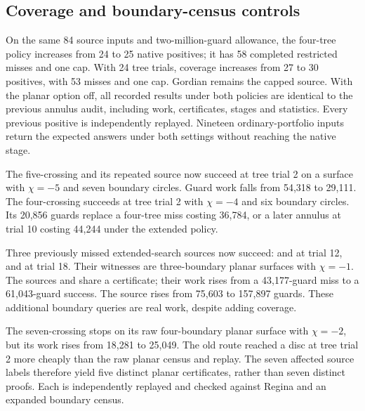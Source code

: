 \subsection{Coverage and boundary-census controls}

On the same 84 source inputs and two-million-guard allowance, the four-tree
policy increases from 24 to 25 native positives; it has 58 completed
restricted misses and one cap. With 24 tree trials, coverage increases
from 27 to 30 positives, with 53 misses and one cap. Gordian remains the
capped source. With the planar option off, all recorded results under both
policies are identical to the previous annulus audit, including work,
certificates, stages and statistics. Every previous positive is independently
replayed. Nineteen ordinary-portfolio inputs return the expected answers
under both settings without reaching the native stage.

The five-crossing  and its repeated source
 now succeed at tree trial 2 on a surface with
$\chi=-5$ and seven boundary circles. Guard work falls from 54,318 to 29,111.
The four-crossing  succeeds at tree trial 2 with
$\chi=-4$ and six boundary circles. Its 20,856 guards replace a four-tree
miss costing 36,784, or a later annulus at trial 10 costing 44,244 under the
extended policy.

Three previously missed extended-search sources now succeed:
 and  at trial 12, and
 at trial 18. Their witnesses are three-boundary planar
surfaces with $\chi=-1$. The sources  and 
share a certificate; their work rises from a 43,177-guard miss to a
61,043-guard success. The source  rises from 75,603 to 157,897 guards.
These additional boundary queries are real work, despite adding coverage.

The seven-crossing  stops on its raw four-boundary
planar surface with $\chi=-2$, but its work rises from 18,281 to 25,049.
The old route reached a disc at tree trial 2 more cheaply than the raw
planar census and replay. The seven affected source labels therefore yield
five distinct planar certificates, rather than seven distinct proofs.
Each is independently replayed and checked against Regina and an expanded
boundary census.


